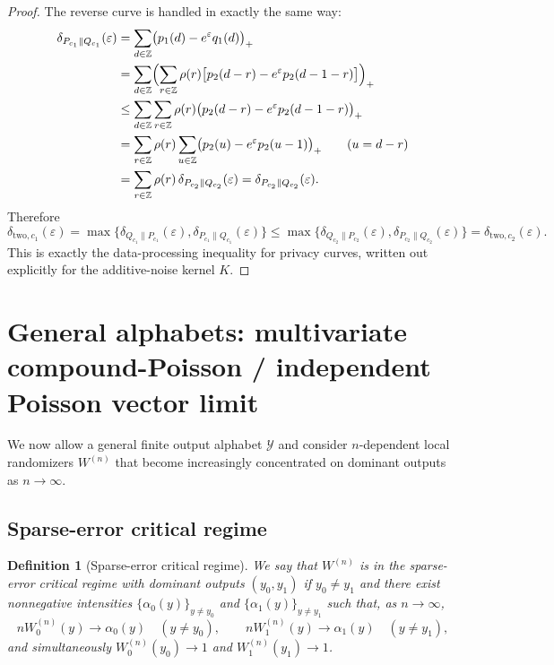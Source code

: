 \documentclass{article}
\newtheorem{definition}[theorem]{Definition}
\begin{document}
\begin{proof}
The reverse curve is handled in exactly the same way:
\begin{align*}
\delta_{P_{c_1}\|Q_{c_1}}(\varepsilon)
&= \sum_{d\in\mathbb Z}\bigl(p_1(d)-e^{\varepsilon}q_1(d)\bigr)_+ \\
&= \sum_{d\in\mathbb Z}\Bigl(\sum_{r\in\mathbb Z}\rho(r)
   \bigl[p_2(d-r)-e^{\varepsilon}p_2(d-1-r)\bigr]\Bigr)_+ \\
&\le \sum_{d\in\mathbb Z}\sum_{r\in\mathbb Z}\rho(r)
   \bigl(p_2(d-r)-e^{\varepsilon}p_2(d-1-r)\bigr)_+ \\
&= \sum_{r\in\mathbb Z}\rho(r)
   \sum_{u\in\mathbb Z}\bigl(p_2(u)-e^{\varepsilon}p_2(u-1)\bigr)_+
   \qquad (u=d-r) \\
&= \sum_{r\in\mathbb Z}\rho(r)\,\delta_{P_{c_2}\|Q_{c_2}}(\varepsilon)
 = \delta_{P_{c_2}\|Q_{c_2}}(\varepsilon).
\end{align*}
Therefore
\[
\delta_{\mathrm{two},c_1}(\varepsilon)
= \max\{\delta_{Q_{c_1}\|P_{c_1}}(\varepsilon),\delta_{P_{c_1}\|Q_{c_1}}(\varepsilon)\}
\le
\max\{\delta_{Q_{c_2}\|P_{c_2}}(\varepsilon),\delta_{P_{c_2}\|Q_{c_2}}(\varepsilon)\}
= \delta_{\mathrm{two},c_2}(\varepsilon).
\]
This is exactly the data-processing inequality for privacy curves, written out explicitly for the
additive-noise kernel $K$.
\end{proof}


\section{General alphabets: multivariate compound-Poisson / independent Poisson vector limit}

We now allow a general finite output alphabet $\mathcal{Y}$ and consider $n$-dependent local randomizers $W^{(n)}$
that become increasingly concentrated on dominant outputs as $n \to \infty$.

\subsection{Sparse-error critical regime}

\begin{definition}[Sparse-error critical regime]
\label{def:sparse-error}
We say that $W^{(n)}$ is in the \emph{sparse-error critical regime} with dominant outputs $(y_0, y_1)$ if $y_0 \neq y_1$ and there exist nonnegative intensities $\{\alpha_0(y)\}_{y \neq y_0}$
and $\{\alpha_1(y)\}_{y \neq y_1}$ such that, as $n \to \infty$,
\[
n W^{(n)}_0(y) \to \alpha_0(y) \quad (y \neq y_0), \qquad n W^{(n)}_1(y) \to \alpha_1(y) \quad (y \neq y_1),
\]
and simultaneously $W^{(n)}_0(y_0) \to 1$ and $W^{(n)}_1(y_1) \to 1$.
\end{definition}
\end{document}
